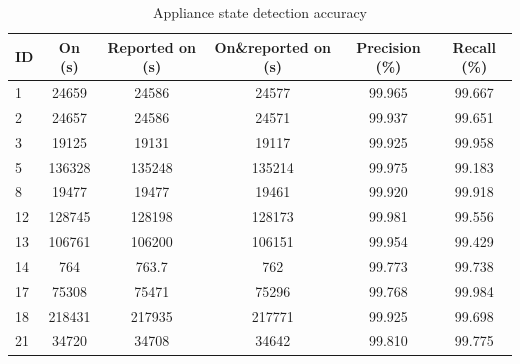 \begin{table}
  \centering
  \begin{tabular}{lccccc}
  \hline
  ID & On (s) & Reported on (s) & On\&reported on (s) & Precision (\%) & Recall (\%) \\
  \hline
﻿1  & 24659  & 24586  & 24577   &99.965 &99.667 \\
2  & 24657  & 24586  & 24571   &99.937 &99.651 \\
3  & 19125  & 19131  & 19117   &99.925 &99.958 \\
5  & 136328 & 135248 & 135214  &99.975 &99.183 \\
8  & 19477  & 19477  & 19461   &99.920 &99.918 \\
12 & 128745 & 128198 & 128173  &99.981 &99.556 \\
13 & 106761 & 106200 & 106151  &99.954 &99.429 \\
14 & 764    & 763.7  & 762     &99.773 &99.738 \\
17 & 75308  & 75471  & 75296   &99.768 &99.984 \\
18 & 218431 & 217935 & 217771  &99.925 &99.698 \\
21 & 34720  & 34708  & 34642   &99.810  &99.775 \\
  \hline
  \end{tabular}
  \caption{Appliance state detection accuracy}
  \label{tab:pre-recall}
\end{table}


